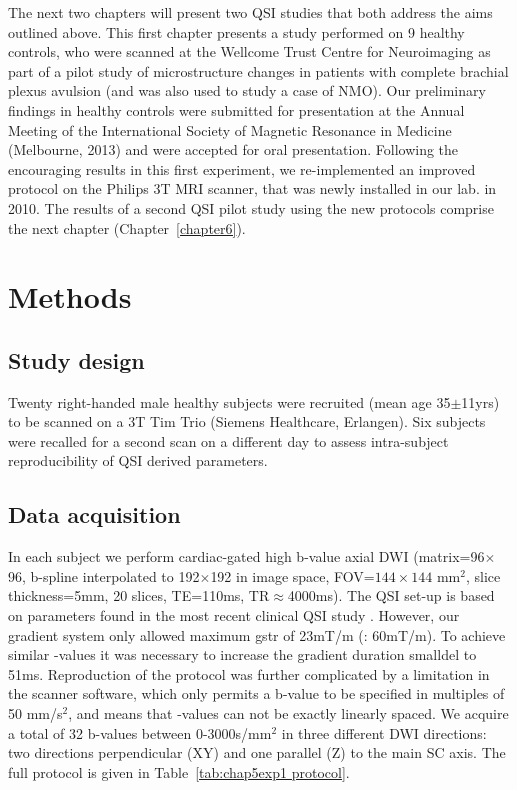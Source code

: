 The next two chapters will present two \gls{QSI} studies that both address the aims outlined above. This first chapter presents a study performed on 9 healthy controls, who were scanned at the Wellcome Trust Centre for Neuroimaging as part of a pilot study of microstructure changes in patients with complete brachial plexus avulsion \citep{Kachramanoglou:2012} (and was also used to study a case of \gls{NMO}). Our preliminary findings in healthy controls were submitted for presentation at the Annual Meeting of the International Society of Magnetic Resonance in Medicine (Melbourne, 2013) and were accepted for oral presentation. Following the encouraging results in this first experiment, we re-implemented an improved protocol on the Philips 3T MRI scanner, that was newly installed in our lab. in 2010. The results of a second \gls{QSI} pilot study using the new protocols comprise the next chapter (Chapter~\ref{chapter6}).

\section{Methods}
\label{sec:chapter 5 exp1 methods}
\subsection{Study design}
Twenty right-handed male healthy subjects were recruited (mean age 35$\pm$11yrs) to be scanned on a 3T Tim Trio (Siemens Healthcare, Erlangen). Six subjects were recalled for a second scan on a different day to assess intra-subject reproducibility of \gls{QSI} derived parameters.

\subsection{Data acquisition}
In each subject we perform cardiac-gated high b-value axial {\gls{DWI}} (matrix=96$\times$96, b-spline interpolated to 192$\times$192 in image space, FOV=$144\times144$ mm$^2$, slice thickness=5mm, 20 slices, TE=110ms, TR$\approx$4000ms). The \gls{QSI} set-up is based on parameters found in the most recent clinical \gls{QSI} study \citep{Farrell:2008}. However, our gradient system only allowed maximum \gls{gstr} of 23mT/m (\citet{Farrell:2008}: 60mT/m). To achieve similar {\q}-values it was necessary to increase the gradient duration \gls{smalldel} to 51ms. Reproduction of the protocol was further complicated by a limitation in the scanner software, which only permits a b-value to be specified in multiples of 50 mm/s$^2$, and means that {\q}-values can not be exactly linearly spaced. We acquire a total of 32 b-values between 0-3000s/mm$^2$ in three different {\gls{DWI}} directions: two directions perpendicular (XY) and one parallel (Z) to the main {\gls{SC}} axis. The full protocol is given in Table~\ref{tab:chap5exp1 protocol}.

